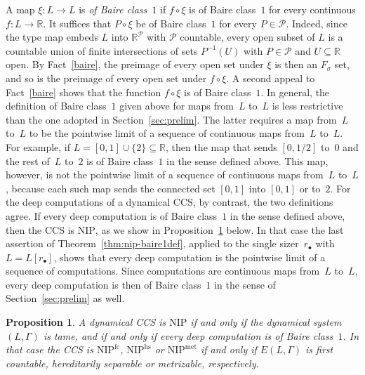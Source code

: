 \documentclass[psamsfonts]{amsart}
\newtheorem{prop}[thm]{Proposition}
\theoremstyle{definition}
\theoremstyle{remark}
\newcommand{\NIP}{\text{NIP}}
\numberwithin{equation}{section}
\begin{document}
A map $\xi\colon L\to L$ is \emph{of Baire class~$1$} if $f\circ \xi$ is of
Baire class~$1$ for every continuous $f\colon L\to\mathbb{R}$.
It suffices that $P\circ \xi$ be of Baire class~$1$ for every $P\in\mathcal{P}$.
Indeed, since the type map embeds $L$ into $\mathbb{R}^{\mathcal{P}}$ with $\mathcal{P}$ countable, every open subset of $L$ is a countable union of finite intersections of sets $P^{-1}(U)$ with $P\in\mathcal{P}$ and $U\subseteq\mathbb{R}$ open.
By Fact~\ref{baire}, the preimage of every open set under $\xi$ is then an $F_\sigma$ set, and so is the preimage of every open set under $f\circ \xi$.
A second appeal to Fact~\ref{baire} shows that the function $f\circ\xi$ is of Baire class~$1$.
In general, the definition of Baire class~$1$ given above for maps from~$L$ to~$L$ is less restrictive than the one adopted in Section~\ref{sec:prelim}.
The latter requires a map from~$L$ to~$L$ to be the pointwise limit of a sequence of continuous maps from~$L$ to~$L$.
For example, if $L=[0,1]\cup\{2\}\subseteq\mathbb{R}$, then the map that sends $[0,1/2]$ to~$0$ and the rest of~$L$ to~$2$ is of Baire class~$1$ in the sense defined above.
This map, however, is not the pointwise limit of a sequence of continuous maps from~$L$ to~$L$, because each such map sends the connected set $[0,1]$ into $[0,1]$ or to~$2$.
For the deep computations of a dynamical CCS, by contrast, the two definitions agree.
If every deep computation is of Baire class~$1$ in the sense defined above, then the CCS is $\NIP$, as we show in Proposition~\ref{prop:cascade-tame} below.
In that case the last assertion of Theorem~\ref{thm:nip-baire1def}, applied to the single sizer~$r_\bullet$ with $L=L[r_\bullet]$, shows that every deep computation is the pointwise limit of a sequence of computations.
Since computations are continuous maps from~$L$ to~$L$, every deep computation is then of Baire class~$1$ in the sense of Section~\ref{sec:prelim} as well.

\begin{prop}\label{prop:cascade-tame}
A dynamical CCS is $\NIP$ if and only if the dynamical system $(L,\Gamma)$ is
tame, and if and only if every deep computation is of Baire class~$1$.
In that case the CCS is $\NIP^{\mathrm{fc}}$, $\NIP^{\mathrm{hs}}$ or $\NIP^{\mathrm{met}}$ if and only if $E(L,\Gamma)$ is
first countable, hereditarily separable or metrizable, respectively.
\end{prop}
\end{document}
